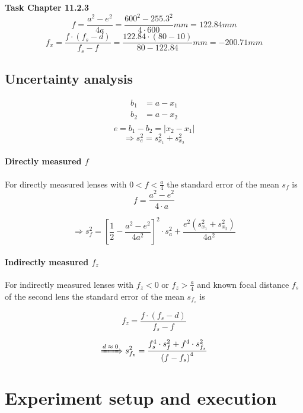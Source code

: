 \documentclass{scrreprt}
\begin{document}
\textbf{Task Chapter 11.2.3}
\begin{equation}
f = \frac{a^2-e^2}{4a} = \frac{600^2-255.3^2}{4\cdot 600}mm = 122.84mm
\end{equation}
\begin{equation}
f_x = \frac{f \cdot (f_s-d)}{f_s-f} = \frac{122.84\cdot (80-10)}{80-122.84}mm = -200.71mm
\end{equation}

\subsection{Uncertainty analysis}

\begin{align*}
b_1 &= a - x_1\\
b_2 &= a - x_2\\
\end{align*}
\[e = b_1 - b_2 = \lvert x_2 - x_1 \rvert\]
\begin{equation}
\Longrightarrow s_e^2 = s_{x_1}^2 + s_{x_2}^2
\end{equation}

\paragraph*{Directly measured $f$}
For directly measured lenses with $0 < f < \frac{a}{4}$ the standard error of the mean $s_f$ is
\[
f = \frac{a^2-e^2}{4\cdot a}
\]

\begin{equation}
\Longrightarrow s_f^2 = \left[ \frac{1}{2} - \frac{a^2-e^2}{4 a^2} \right]^2 \cdot s_a^2 + \frac{e^2 \left( s_{x_1}^2 + s_{x_2}^2 \right)}{4  a^2}
\end{equation}

\paragraph*{Indirectly measured $f_z$} For indirectly measured lenses with $f_z < 0$ or $f_z > \frac{a}{4}$ and known focal distance $f_s$ of the second lens the standard error of the mean $s_{f_z}$ is

\[f_z = \frac{f \cdot \left( f_s - d\right)}{f_s - f}\]


\begin{equation}
\xRightarrow{d \; \approx \; 0} s_{f_z}^2 = \frac{f_s^4\cdot s_f^2 + f^4 \cdot s_{f_s}^2}{\left( f-f_s \right)^4}
\end{equation}

\section{Experiment setup and execution}
\end{document}

